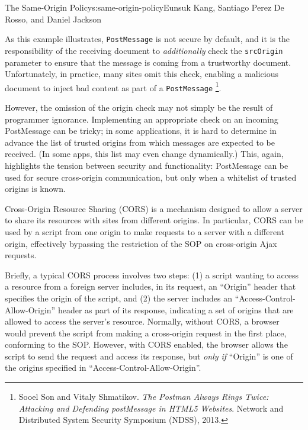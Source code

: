 \begin{aosachapter}{The Same-Origin Policy}{s:same-origin-policy}{Eunsuk Kang, Santiago Perez De Rosso, and Daniel Jackson}

As this example illustrates, \texttt{PostMessage} is not secure by
default, and it is the responsibility of the receiving document to
\emph{additionally} check the \texttt{srcOrigin} parameter to ensure
that the message is coming from a trustworthy document. Unfortunately,
in practice, many sites omit this check, enabling a malicious document
to inject bad content as part of a \texttt{PostMessage} \footnote{Sooel
  Son and Vitaly Shmatikov. \emph{The Postman Always Rings Twice:
  Attacking and Defending postMessage in HTML5 Websites}. Network and
  Distributed System Security Symposium (NDSS), 2013.}.

However, the omission of the origin check may not simply be the result
of programmer ignorance. Implementing an appropriate check on an
incoming PostMessage can be tricky; in some applications, it is hard to
determine in advance the list of trusted origins from which messages are
expected to be received. (In some apps, this list may even change
dynamically.) This, again, highlights the tension between security and
functionality: PostMessage can be used for secure cross-origin
communication, but only when a whitelist of trusted origins is known.

\label{cross-origin-resource-sharing-cors}

Cross-Origin Resource Sharing (CORS) is a mechanism designed to allow a
server to share its resources with sites from different origins. In
particular, CORS can be used by a script from one origin to make
requests to a server with a different origin, effectively bypassing the
restriction of the SOP on cross-origin Ajax requests.

Briefly, a typical CORS process involves two steps: (1) a script wanting
to access a resource from a foreign server includes, in its request, an
``Origin'' header that specifies the origin of the script, and (2) the
server includes an ``Access-Control-Allow-Origin'' header as part of its
response, indicating a set of origins that are allowed to access the
server's resource. Normally, without CORS, a browser would prevent the
script from making a cross-origin request in the first place, conforming
to the SOP. However, with CORS enabled, the browser allows the script to
send the request and access its response, but \emph{only if} ``Origin''
is one of the origins specified in ``Access-Control-Allow-Origin''.


\end{aosachapter}

